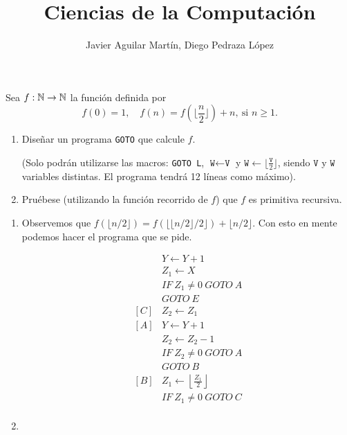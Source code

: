 \documentclass[twoside]{article}
\begin{document}
\title{Ciencias de la Computación}

\author{Javier Aguilar Martín, Diego Pedraza López}
\maketitle

\begin{ejercicio}{1}
Sea $f : \mathbb{N} \to \mathbb{N}$ la función definida por
$$f(0) = 1,\quad f(n) = f(\lfloor\frac{n}{2}\rfloor) + n,\ \text{si }n \geq 1.$$
\begin{enumerate}
\item Diseñar un programa \texttt{GOTO} que calcule $f$.

(Solo podrán utilizarse las macros: \texttt{GOTO L}, $\texttt{W}\leftarrow \texttt{V}$ y $\texttt{W}\leftarrow   \lfloor\frac{\texttt{V}}{2}\rfloor$, siendo $\texttt{V}$ y $\texttt{W}$ variables
distintas. El programa tendrá 12 líneas como máximo).
\item Pruébese (utilizando la función recorrido de $f$) que $f$ es primitiva recursiva.
\end{enumerate}
\end{ejercicio}
\begin{solucion}
\begin{enumerate}
\item Observemos que $f(\lfloor n/2\rfloor)=f(\lfloor\lfloor n/2\rfloor/2\rfloor)+\lfloor n/2\rfloor$. Con esto en mente podemos hacer el programa que se pide.

\begin{align*}
& Y\leftarrow Y+1\\
&Z_1\leftarrow X\\
& IF\ Z_1\neq 0\ GOTO\ A\\
& GOTO\ E\\
[C]&Z_2\leftarrow Z_1\\
[A]& Y\leftarrow Y+1\\
&Z_2\leftarrow Z_2-1\\
&IF\ Z_2\neq 0\ GOTO\ A\\
&GOTO\ B\\
[B]&Z_1\leftarrow \left\lfloor\frac{Z_1}{2}\right\rfloor\\
& IF\ Z_1\neq 0\ GOTO\ C\\
\end{align*}


\item
\end{enumerate}
\end{solucion}
\end{document}
